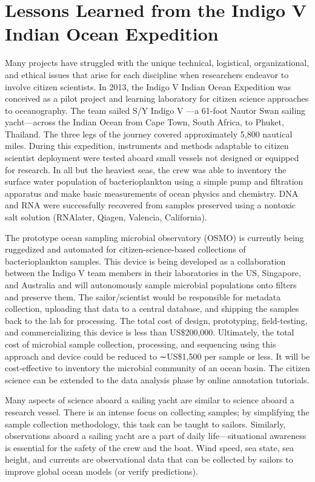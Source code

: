 \section{Lessons Learned from the Indigo V Indian Ocean Expedition}

Many projects have struggled with the unique technical, logistical, organizational, and ethical issues that arise for each discipline when researchers endeavor to involve citizen scientists. In 2013, the Indigo V Indian Ocean Expedition was conceived as a pilot project and learning laboratory for citizen science approaches to oceanography. The team sailed S/Y Indigo V —a 61-foot Nautor Swan sailing yacht—across the Indian Ocean from Cape Town, South Africa, to Phuket, Thailand. The three legs of the journey covered approximately 5,800 nautical miles. During this expedition, instruments and methods adaptable to citizen scientist deployment were tested aboard small vessels not designed or equipped for research. In all but the heaviest seas, the crew was able to inventory the surface water population of bacterioplankton using a simple pump and filtration apparatus and make basic measurements of ocean physics and chemistry. DNA and RNA were successfully recovered from samples preserved using a nontoxic salt solution (RNAlater, Qiagen, Valencia, California).

The prototype ocean sampling microbial observatory (OSMO) is currently being ruggedized and automated for citizen-science-based collections of bacterioplankton samples. This device is being developed as a collaboration between the Indigo V team members in their laboratories in the US, Singapore, and Australia and will autonomously sample microbial populations onto filters and preserve them. The sailor/scientist would be responsible for metadata collection, uploading that data to a central database, and shipping the samples back to the lab for processing. The total cost of design, prototyping, field-testing, and commercializing this device is less than US\$200,000. Ultimately, the total cost of microbial sample collection, processing, and sequencing using this approach and device could be reduced to ∼US\$1,500 per sample or less. It will be cost-effective to inventory the microbial community of an ocean basin. The citizen science can be extended to the data analysis phase by online annotation tutorials.

Many aspects of science aboard a sailing yacht are similar to science aboard a research vessel. There is an intense focus on collecting samples; by simplifying the sample collection methodology, this task can be taught to sailors. Similarly, observations aboard a sailing yacht are a part of daily life—situational awareness is essential for the safety of the crew and the boat. Wind speed, sea state, sea height, and currents are observational data that can be collected by sailors to improve global ocean models (or verify predictions).

